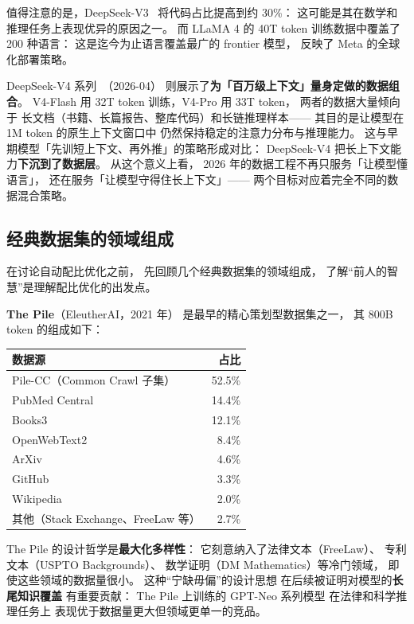 值得注意的是，DeepSeek-V3~\cite{deepseekv3}
将代码占比提高到约 30\%：
这可能是其在数学和推理任务上表现优异的原因之一。
而 LLaMA 4 的 40T token 训练数据中覆盖了 200 种语言：
这是迄今为止语言覆盖最广的 frontier 模型，
反映了 Meta 的全球化部署策略。

DeepSeek-V4 系列~\cite{deepseekv4}（2026-04）
则展示了\textbf{为「百万级上下文」量身定做的数据组合}。
V4-Flash 用 32T token 训练，V4-Pro 用 33T token，
两者的数据大量倾向于
长文档（书籍、长篇报告、整库代码）和长链推理样本——
其目的是让模型在 1M token 的原生上下文窗口中
仍然保持稳定的注意力分布与推理能力。
这与早期模型「先训短上下文、再外推」的策略形成对比：
DeepSeek-V4 把长上下文能力\textbf{下沉到了数据层}。
从这个意义上看，
2026 年的数据工程不再只服务「让模型懂语言」，
还在服务「让模型守得住长上下文」——
两个目标对应着完全不同的数据混合策略。

\subsection{经典数据集的领域组成}

在讨论自动配比优化之前，
先回顾几个经典数据集的领域组成，
了解“前人的智慧”是理解配比优化的出发点。

\textbf{The Pile}（EleutherAI，2021 年）
是最早的精心策划型数据集之一，
其 800B token 的组成如下：

\begin{center}\small
\renewcommand{\arraystretch}{1.3}
\begin{tabular}{lr}
\toprule
\rowcolor{figLightGray}
\textbf{数据源} & \textbf{占比} \\
\midrule
Pile-CC（Common Crawl 子集） & 52.5\% \\
PubMed Central & 14.4\% \\
Books3 & 12.1\% \\
OpenWebText2 & 8.4\% \\
ArXiv & 4.6\% \\
GitHub & 3.3\% \\
Wikipedia & 2.0\% \\
其他（Stack Exchange、FreeLaw 等） & 2.7\% \\
\bottomrule
\end{tabular}
\end{center}

The Pile 的设计哲学是\textbf{最大化多样性}：
它刻意纳入了法律文本（FreeLaw）、
专利文本（USPTO Backgrounds）、
数学证明（DM Mathematics）等冷门领域，
即使这些领域的数据量很小。
这种“宁缺毋偏”的设计思想
在后续被证明对模型的\textbf{长尾知识覆盖}
有重要贡献：
The Pile 上训练的 GPT-Neo 系列模型
在法律和科学推理任务上
表现优于数据量更大但领域更单一的竞品。

